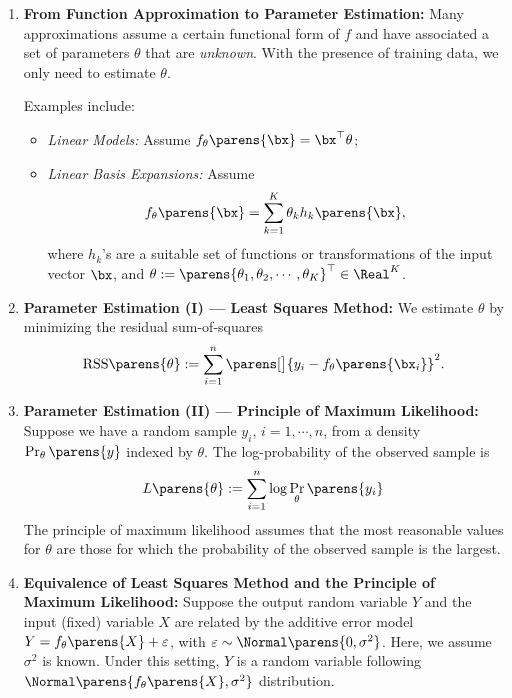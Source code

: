 \documentclass[12pt]{article}
\begin{document}
\begin{enumerate}[label=\textbf{\arabic*.}]
	\item \textbf{From Function Approximation to Parameter Estimation:} Many approximations assume a certain functional form of $f$ and have associated a set of parameters $\theta$ that are \emph{unknown}. With the presence of training data, we only need to estimate $\theta$. 
	
	Examples include: 
	\begin{itemize}
		\item \textit{Linear Models:} Assume $f_{\theta} \parens{\bx} = \bx^\top \theta$; 
		\item \textit{Linear Basis Expansions:} Assume 
		\begin{align*}
			f_{\theta} \parens{\bx} = \sum_{k=1}^K \theta_k h_k \parens{\bx}, 
		\end{align*}
		where $h_k$'s are a suitable set of functions or transformations of the input vector $\bx$, and $\theta := \parens{\theta_1, \theta_2, \cdots, \theta_K}^\top \in \Real^K$. 
	\end{itemize}
	
	\item \textbf{Parameter Estimation (I) --- Least Squares Method:} We estimate $\theta$ by minimizing the residual sum-of-squares 
	\begin{align}
		\mathrm{RSS} \parens{\theta} := \sum_{i=1}^n \parens[\big]{y_i - f_{\theta} \parens{\bx_i}}^2. 
	\end{align} 
	
	\item \textbf{Parameter Estimation (II) --- Principle of Maximum Likelihood:} Suppose we have a random sample $y_i$, $i = 1, \cdots, n$, from a density $\Pr_{\theta} \parens{y}$ indexed by $\theta$. The log-probability of the observed sample is
	\begin{align}
		L \parens{\theta} := \sum_{i=1}^n \log \Pr_{\theta} \parens{y_i}
	\end{align}
	The principle of maximum likelihood assumes that the most reasonable values for $\theta$ are those for which the probability of the observed sample is the largest. 
	
	\item \textbf{Equivalence of Least Squares Method and the Principle of Maximum Likelihood:} Suppose the output random variable $Y$ and the input (fixed) variable $X$ are related by the additive error model $Y = f_{\theta} \parens{X} + \varepsilon$, with $\varepsilon \sim \Normal \parens{0, \sigma^2}$. Here, we assume $\sigma^2$ is known. Under this setting, $Y$ is a random variable following $\Normal \parens{f_{\theta} \parens{X}, \sigma^2}$ distribution. 
	

\end{enumerate}
\end{document}
